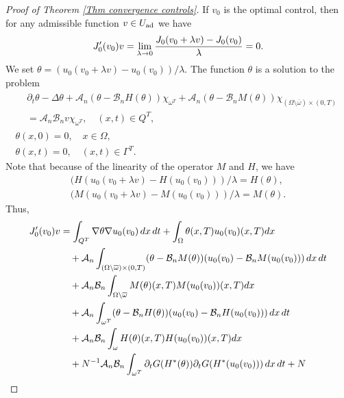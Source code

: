 \documentclass[reqno]{amsart}
\begin{document}
\begin{proof}[Proof of Theorem \ref{Thm convergence controls}]
If $v_0$ is the optimal control, then for any admissible function $v\in U_{\rm ad}$ 
we have
\[
J_0'(v_0)v = \lim _{\lambda \to 0}\frac{%
J_0(v_0+\lambda v)-J_0(v_0)}{\lambda }=0.
\]
We set $\theta =(u_0(v_0+\lambda v)-u_0(v_0))/\lambda $. The
function $\theta $ is a solution to the  problem
\begin{equation}
\begin{gathered}
\begin{aligned}
&\partial _{t}\theta -\Delta \theta +\mathcal{A}_n(\theta -\mathcal{B}
_nH(\theta ))\chi _{\omega ^{T}}
+\mathcal{A}_n(\theta -\mathcal{B}_nM(\theta ))\chi _{(\Omega \setminus
\overline{\omega })\times (0,T)} \\
&=\mathcal{A}_n\mathcal{B}_nv\chi_{\omega ^{T}}, \quad  (x,t)\in Q^{T},
\end{aligned} \\
\theta (x,0)=0, \quad x\in \Omega , \\
\theta (x,t)=0, \quad  (x,t)\in \Gamma ^{T}.
\end{gathered} \label{limit theta prob}
\end{equation}
Note that because of the linearity of the operator $M$ and $H$, we have
\begin{gather*}
(H(u_0(v_0 + \lambda v) - H(u_0(v_0)))/\lambda = H(\theta), \\
(M(u_0(v_0 + \lambda v) - M(u_0(v_0)))/\lambda = M(\theta).
\end{gather*}
Thus,
\begin{equation}
\begin{aligned}
J_0'(v_0)v
&=\int _{Q^{T}}\nabla \theta \nabla u_0(v_0)%
\,dx\,dt+\int _{\Omega }\theta (x,T)u_0(v_0)(x,T){dx}    \\
&\quad +\mathcal{A}_n\int _{(\Omega \setminus \overline{\omega })\times
(0,T)}(\theta -\mathcal{B}_nM(\theta ))(u_0(v_0)-\mathcal{B}%
_nM(u_0(v_0)))\,dx\,dt    \\
&\quad +\mathcal{A}_n\mathcal{B}_n\int _{\Omega \setminus \overline{%
\omega }}M(\theta )(x,T)M(u_0(v_0))(x,T){dx}    \\
&\quad +\mathcal{A}_n\int _{\omega ^{T}}(\theta -\mathcal{B}_nH(\theta
))(u_0(v_0)-\mathcal{B}_nH(u_0(v_0)))\,dx\,dt    \\
&\quad +\mathcal{A}_n\mathcal{B}_n\int _{\omega }H(\theta
)(x,T)H(u_0(v_0))(x,T){dx}    \\
&\quad +N^{-1}\mathcal{A}_n\mathcal{B}_n\int _{\omega ^{T}}\partial
_{t}G(H^{\ast }(\theta ))\partial _{t}G(H^{\ast }(u_0(v_0)))\,dx\,dt+N%

\end{aligned}
\end{equation}
\end{proof}
\end{document}
